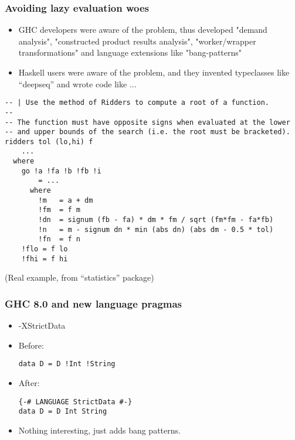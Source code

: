 \documentclass{beamer}
\begin{document}
\begin{frame}
    \frametitle{Avoiding lazy evaluation woes}

    \begin{itemize}
        \item
            GHC developers were aware of the problem, thus developed "demand
            analysis", "constructed product results analysis", "worker/wrapper
            transformations" and language extensions like "bang-patterns"
        \item
            Haskell users were aware of the problem, and they invented
            typeclasses like ``deepseq'' and wrote code like ...
    \end{itemize}
\end{frame}

\begin{frame}[fragile]
            \begin{verbatim}
-- | Use the method of Ridders to compute a root of a function.
--
-- The function must have opposite signs when evaluated at the lower
-- and upper bounds of the search (i.e. the root must be bracketed).
ridders tol (lo,hi) f
    ...
  where
    go !a !fa !b !fb !i
        = ...
      where
        !m   = a + dm
        !fm  = f m
        !dn  = signum (fb - fa) * dm * fm / sqrt (fm*fm - fa*fb)
        !n   = m - signum dn * min (abs dn) (abs dm - 0.5 * tol)
        !fn  = f n
    !flo = f lo
    !fhi = f hi
            \end{verbatim}

            (Real example, from ``statistics'' package)
\end{frame}

\begin{frame}[fragile]
    \frametitle{GHC 8.0 and new language pragmas}

    \begin{itemize}
        \item -XStrictData
        \item
            Before: \\
            \begin{verbatim}
data D = D !Int !String
            \end{verbatim}

        \item
            After: \\
            \begin{verbatim}
{-# LANGUAGE StrictData #-}
data D = D Int String
            \end{verbatim}

        \item
            Nothing interesting, just adds bang patterns.

    \end{itemize}
\end{frame}
\end{document}
